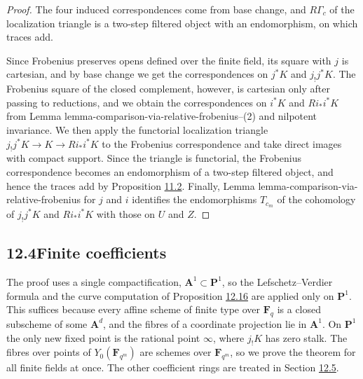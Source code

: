 \documentclass[11pt]{article}
\begin{document}
\begin{proof}[{Proof}]\label{bp284}%
The four induced correspondences come from base change, and \(R\Gamma_c\) of the localization triangle is a two-step filtered object with an endomorphism, on which traces add.

Since Frobenius preserves opens defined over the finite field, its square with \(j\) is cartesian, and by base change we get the correspondences on \(j^*K\) and \(j_!j^*K\). The Frobenius square of the closed complement, however, is cartesian only after passing to reductions, and we obtain the correspondences on \(i^*K\) and \(Ri_*i^*K\) from Lemma lemma-comparison-via-relative-frobenius–(2) and nilpotent invariance. We then apply the functorial localization triangle \(j_!j^*K\to K\to Ri_*i^*K\) to the Frobenius correspondence and take direct images with compact support. Since the triangle is functorial, the Frobenius correspondence becomes an endomorphism of a two-step filtered object, and hence the traces add by Proposition \hyperref[bp176]{11.2}. Finally, Lemma lemma-comparison-via-relative-frobenius for \(j\) and \(i\) identifies the endomorphisms \(T_{c_m}\) of the cohomology of \(j_!j^*K\) and \(Ri_*i^*K\) with those on \(U\) and \(Z\).
\end{proof}


\subsection*{\texorpdfstring{12.4\quad Finite coefficients}{12.4 Finite coefficients}}
\label{bp285}%
\label{bp286}%
The proof uses a single compactification, \(\mathbf A^1\subset\mathbf P^1\), so the Lefschetz–Verdier formula and the curve computation of Proposition \hyperref[bp274]{12.16} are applied only on \(\mathbf P^1\). This suffices because every affine scheme of finite type over \(\mathbf F_q\) is a closed subscheme of some \(\mathbf A^d\), and the fibres of a coordinate projection lie in \(\mathbf A^1\). On \(\mathbf P^1\) the only new fixed point is the rational point \(\infty\), where \(j_!K\) has zero stalk. The fibres over points of \(Y_0(\mathbf F_{q^m})\) are schemes over \(\mathbf F_{q^m}\), so we prove the theorem for all finite fields at once. The other coefficient rings are treated in Section \hyperref[bp289]{12.5}.
\end{document}
